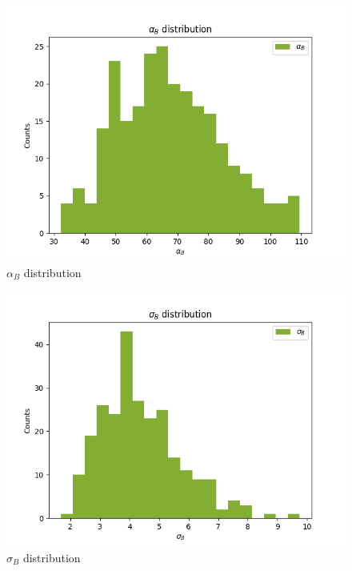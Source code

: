 \documentclass[
]{article}
\begin{document}
\begin{figure}
\centering
\includegraphics{pngplots/param7.png}
\caption{\(\alpha_B\) distribution}
\end{figure}

\begin{figure}
\centering
\includegraphics{pngplots/param8.png}
\caption{\(\sigma_B\) distribution}
\end{figure}
\end{document}
